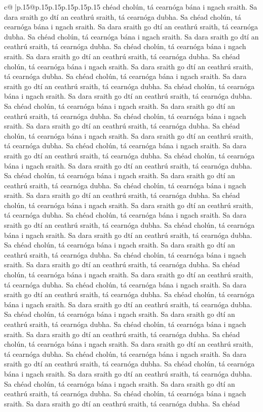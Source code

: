 \documentclass{article}
\begin{document}
{\begin{supertabular}{c@{$\;$}|p{.15\linewidth}@{}p{.15\linewidth}p{.15\linewidth}p{.15\linewidth}p{.15\linewidth}p{.15\linewidth}}
{{{chéad cholún, tá cearnóga bána i ngach sraith. Sa dara sraith go dtí an ceathrú sraith, tá cearnóga dubha. Sa chéad cholún, tá cearnóga bána i ngach sraith. Sa dara sraith go dtí an ceathrú sraith, tá cearnóga dubha. Sa chéad cholún, tá cearnóga bána i ngach sraith. Sa dara sraith go dtí an ceathrú sraith, tá cearnóga dubha. Sa chéad cholún, tá cearnóga bána i ngach sraith. Sa dara sraith go dtí an ceathrú sraith, tá cearnóga dubha. Sa chéad cholún, tá cearnóga bána i ngach sraith. Sa dara sraith go dtí an ceathrú sraith, tá cearnóga dubha. Sa chéad cholún, tá cearnóga bána i ngach sraith. Sa dara sraith go dtí an ceathrú sraith, tá cearnóga dubha. Sa chéad cholún, tá cearnóga bána i ngach sraith. Sa dara sraith go dtí an ceathrú sraith, tá cearnóga dubha. Sa chéad cholún, tá cearnóga bána i ngach sraith. Sa dara sraith go dtí an ceathrú sraith, tá cearnóga dubha. Sa chéad cholún, tá cearnóga bána i ngach sraith. Sa dara sraith go dtí an ceathrú sraith, tá cearnóga dubha. Sa chéad cholún, tá cearnóga bána i ngach sraith. Sa dara sraith go dtí an ceathrú sraith, tá cearnóga dubha. Sa chéad cholún, tá cearnóga bána i ngach sraith. Sa dara sraith go dtí an ceathrú sraith, tá cearnóga dubha. Sa chéad cholún, tá cearnóga bána i ngach sraith. Sa dara sraith go dtí an ceathrú sraith, tá cearnóga dubha. Sa chéad cholún, tá cearnóga bána i ngach sraith. Sa dara sraith go dtí an ceathrú sraith, tá cearnóga dubha. Sa chéad cholún, tá cearnóga bána i ngach sraith. Sa dara sraith go dtí an ceathrú sraith, tá cearnóga dubha. Sa chéad cholún, tá cearnóga bána i ngach sraith. Sa dara sraith go dtí an ceathrú sraith, tá cearnóga dubha. Sa chéad cholún, tá cearnóga bána i ngach sraith. Sa dara sraith go dtí an ceathrú sraith, tá cearnóga dubha. Sa chéad cholún, tá cearnóga bána i ngach sraith. Sa dara sraith go dtí an ceathrú sraith, tá cearnóga dubha. Sa chéad cholún, tá cearnóga bána i ngach sraith. Sa dara sraith go dtí an ceathrú sraith, tá cearnóga dubha. Sa chéad cholún, tá cearnóga bána i ngach sraith. Sa dara sraith go dtí an ceathrú sraith, tá cearnóga dubha. Sa chéad cholún, tá cearnóga bána i ngach sraith. Sa dara sraith go dtí an ceathrú sraith, tá cearnóga dubha. Sa chéad cholún, tá cearnóga bána i ngach sraith. Sa dara sraith go dtí an ceathrú sraith, tá cearnóga dubha. Sa chéad cholún, tá cearnóga bána i ngach sraith. Sa dara sraith go dtí an ceathrú sraith, tá cearnóga dubha. Sa chéad cholún, tá cearnóga bána i ngach sraith. Sa dara sraith go dtí an ceathrú sraith, tá cearnóga dubha. Sa chéad cholún, tá cearnóga bána i ngach sraith. Sa dara sraith go dtí an ceathrú sraith, tá cearnóga dubha. Sa chéad cholún, tá cearnóga bána i ngach sraith. Sa dara sraith go dtí an ceathrú sraith, tá cearnóga dubha. Sa chéad cholún, tá cearnóga bána i ngach sraith. Sa dara sraith go dtí an ceathrú sraith, tá cearnóga dubha. Sa chéad cholún, tá cearnóga bána i ngach sraith. Sa dara sraith go dtí an ceathrú sraith, tá cearnóga dubha. Sa chéad cholún, tá cearnóga bána i ngach sraith. Sa dara sraith go dtí an ceathrú sraith, tá cearnóga dubha. Sa chéad cholún, tá cearnóga bána i ngach sraith. Sa dara sraith go dtí an ceathrú sraith, tá cearnóga dubha. Sa chéad }}}
\end{supertabular}}
\end{document}
